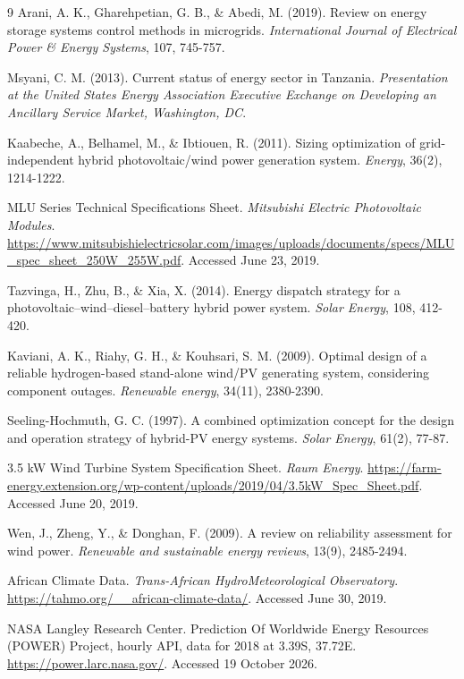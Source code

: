 \documentclass[final,3p,times]{elsarticle}
\begin{document}
\begin{thebibliography}{9}
Arani, A. K., Gharehpetian, G. B., \& Abedi, M. (2019). Review on energy storage systems control methods in microgrids. \textit{International Journal of Electrical Power \& Energy Systems}, 107, 745-757.

Msyani, C. M. (2013). Current status of energy sector in Tanzania. \textit{Presentation at the United States Energy Association Executive Exchange on Developing an Ancillary Service Market, Washington, DC}.

Kaabeche, A., Belhamel, M., \& Ibtiouen, R. (2011). Sizing optimization of grid-independent hybrid photovoltaic/wind power generation system. \textit{Energy}, 36(2), 1214-1222.

MLU Series Technical Specifications Sheet. \textit{Mitsubishi Electric Photovoltaic Modules}. \url{https://www.mitsubishielectricsolar.com/images/uploads/documents/specs/MLU_spec_sheet_250W_255W.pdf}. Accessed June 23, 2019.

Tazvinga, H., Zhu, B., \& Xia, X. (2014). Energy dispatch strategy for a photovoltaic–wind–diesel–battery hybrid power system. \textit{Solar Energy}, 108, 412-420.

Kaviani, A. K., Riahy, G. H., \& Kouhsari, S. M. (2009). Optimal design of a reliable hydrogen-based stand-alone wind/PV generating system, considering component outages. \textit{Renewable energy}, 34(11), 2380-2390.

Seeling-Hochmuth, G. C. (1997). A combined optimization concept for the design and operation strategy of hybrid-PV energy systems. \textit{Solar Energy}, 61(2), 77-87.

3.5 kW Wind Turbine System Specification Sheet. \textit{Raum Energy}. \url{https://farm-energy.extension.org/wp-content/uploads/2019/04/3.5kW_Spec_Sheet.pdf}. Accessed June 20, 2019.

Wen, J., Zheng, Y., \& Donghan, F. (2009). A review on reliability assessment for wind power. \textit{Renewable and sustainable energy reviews}, 13(9), 2485-2494.

African Climate Data. \textit{Trans-African HydroMeteorological Observatory}.
\url{https://tahmo.org/__african-climate-data/}. Accessed June 30, 2019.

NASA Langley Research Center. Prediction Of Worldwide Energy Resources (POWER) Project, hourly API, data for 2018 at 3.39\degree S, 37.72\degree E. \url{https://power.larc.nasa.gov/}. Accessed 19 October 2026.


\end{thebibliography}
\end{document}
